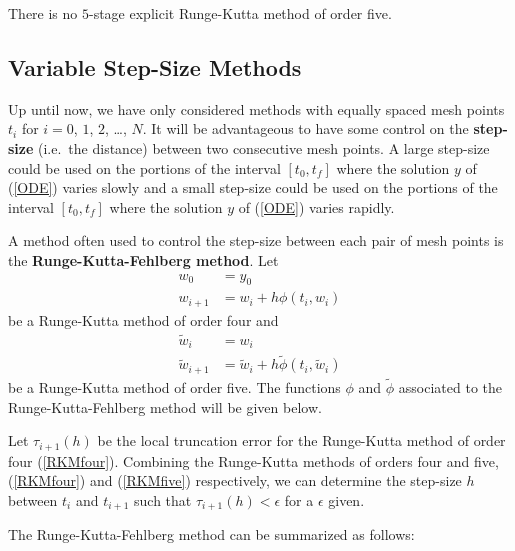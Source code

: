 \begin{theorem}
There is no $5$-stage explicit Runge-Kutta method of order five.
\end{theorem}

\subsection{Variable Step-Size Methods}

Up until now, we have only considered methods with equally spaced mesh
points $t_i$ for $i=0$, $1$, $2$, \ldots, $N$.  It will be advantageous to
have some control on the {\bfseries step-size}
(i.e.\ the distance) between two consecutive mesh points.  A large
step-size could be used on the portions of the interval $[t_0,t_f]$
where the solution $y$ of (\ref{ODE}) varies slowly and a small
step-size could be used on the portions of the interval $[t_0,t_f]$
where the solution $y$ of (\ref{ODE}) varies rapidly.

A method often used to control the step-size between each pair of mesh
points is the
{\bfseries Runge-Kutta-Fehlberg method}.
Let
\begin{equation} \label{RKMfour}
\begin{split}
w_0 &= y_0 \\
w_{i+1} &= w_i + h\phi(t_i,w_i)
\end{split}
\end{equation}
be a Runge-Kutta method of order four and
\begin{equation} \label{RKMfive}
\begin{split}
\tilde{w}_i &= w_i \\
\tilde{w}_{i+1} &= \tilde{w}_i + h \tilde{\phi}(t_i,\tilde{w}_i)
\end{split}
\end{equation}
be a Runge-Kutta method of order five.  The functions $\phi$ and
$\tilde{\phi}$ associated to the Runge-Kutta-Fehlberg method will be
given below.

Let $\tau_{i+1}(h)$ be the local truncation error for the Runge-Kutta
method of order four (\ref{RKMfour}).  Combining the Runge-Kutta
methods of orders four and five, (\ref{RKMfour}) and (\ref{RKMfive})
respectively, we can determine the step-size $h$ between $t_i$ and
$t_{i+1}$ such that $\tau_{i+1}(h)<\epsilon$ for a $\epsilon$ given.

The Runge-Kutta-Fehlberg method can be summarized as follows:

